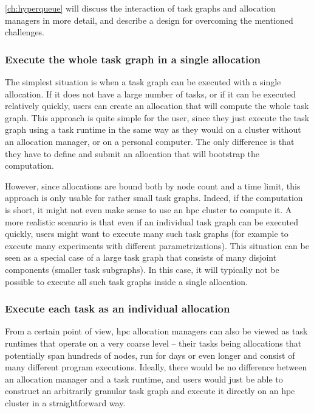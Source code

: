\autoref{ch:hyperqueue} will discuss the interaction of task graphs and allocation managers in
more detail, and describe a design for overcoming the mentioned challenges.


\subsubsection*{Execute the whole task graph in a single allocation}
The simplest situation is when a task graph can be executed with a single allocation. If it does
not have a large number of tasks, or if it can be executed relatively quickly, users can create an
allocation that will compute the whole task graph. This approach is quite simple for the user,
since they just execute the task graph using a task runtime in the same way as they would on a
cluster without an allocation manager, or on a personal computer. The only difference is that they
have to define and submit an allocation that will bootstrap the computation.

However, since allocations are bound both by node count and a time limit, this approach is only
usable for rather small task graphs. Indeed, if the computation is short, it might not even make
sense to use an \gls{hpc} cluster to compute it. A more realistic scenario is
that even if an individual task graph can be executed quickly, users might want to execute many
such task graphs (for example to execute many experiments with different parametrizations). This
situation can be seen as a special case of a large task graph that consists of many disjoint
components (smaller task subgraphs). In this case, it will typically not be possible to execute all
such task graphs inside a single allocation.

\subsubsection*{Execute each task as an individual allocation}
From a certain point of view, \gls{hpc} allocation managers can also be viewed as
task runtimes that operate on a very coarse level -- their tasks being allocations that potentially
span hundreds of nodes, run for days or even longer and consist of many different program
executions. Ideally, there would be no difference between an allocation manager and a task runtime,
and users would just be able to construct an arbitrarily granular task graph and execute it
directly on an \gls{hpc} cluster in a straightforward way.

